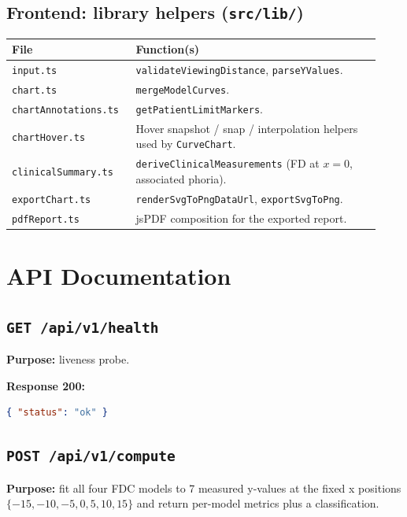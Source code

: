 \documentclass[11pt,a4paper]{article}
\begin{document}
\subsection{Frontend: library helpers (\texttt{src/lib/})}
\begin{longtable}{@{}p{0.30\linewidth} p{0.63\linewidth}@{}}
\toprule
\textbf{File} & \textbf{Function(s)} \\
\midrule
\texttt{input.ts}             & \texttt{validateViewingDistance},
                                 \texttt{parseYValues}. \\
\texttt{chart.ts}             & \texttt{mergeModelCurves}. \\
\texttt{chartAnnotations.ts}  & \texttt{getPatientLimitMarkers}. \\
\texttt{chartHover.ts}        & Hover snapshot / snap / interpolation
                                 helpers used by \texttt{CurveChart}. \\
\texttt{clinicalSummary.ts}   & \texttt{deriveClinicalMeasurements}
                                 (FD at $x=0$, associated phoria). \\
\texttt{exportChart.ts}       & \texttt{renderSvgToPngDataUrl},
                                 \texttt{exportSvgToPng}. \\
\texttt{pdfReport.ts}         & jsPDF composition for the exported report. \\
\bottomrule
\end{longtable}

\section{API Documentation}
\label{sec:api}

\subsection{\texttt{GET /api/v1/health}}
\textbf{Purpose:} liveness probe.

\textbf{Response 200:}
\begin{lstlisting}[language=json]
{ "status": "ok" }
\end{lstlisting}

\subsection{\texttt{POST /api/v1/compute}}
\textbf{Purpose:} fit all four FDC models to 7 measured y-values at the fixed
x positions $\{-15,-10,-5,0,5,10,15\}$ and return per-model metrics plus a
classification.
\end{document}
